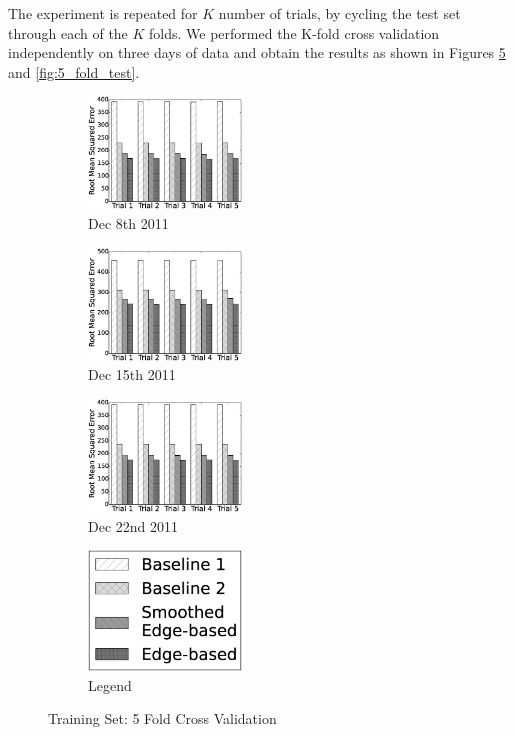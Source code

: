 \documentclass{sig-alternate}
\begin{document}
The experiment is repeated for $K$ number of trials, by cycling the test set through each of the $K$ folds. We performed the K-fold cross validation independently on three days of data and obtain the results as shown in Figures \ref{fig:5_fold_train} and \ref{fig:5_fold_test}. 
\begin{figure}[htb]
	\centering
	\begin{subfigure}{1.6in}
		\includegraphics[width=1.6in]{20111208_train} %
		\caption{Dec 8th 2011}
		\label{fig:20111208_train}
	\end{subfigure}
	\begin{subfigure}{1.6in}
		\includegraphics[width=1.6in]{20111215_train} %
		\caption{Dec 15th 2011}
		\label{fig:20111215_train}
	\end{subfigure}
	\begin{subfigure}{1.6in}
		\includegraphics[width=1.6in]{20111222_train} %
		\caption{Dec 22nd 2011}
		\label{fig:20111222_train}
	\end{subfigure}
	\begin{subfigure}{1.6in}
		\includegraphics[width=1.6in]{legend} %
		\caption{Legend}
		\label{fig:legend_train}
	\end{subfigure}
	\caption{Training Set: 5 Fold Cross Validation}
	\label{fig:5_fold_train}
\end{figure}
\end{document}
